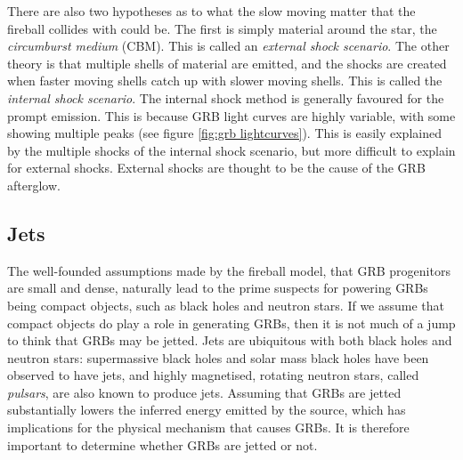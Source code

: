 \documentclass[11pt]{cuthesis}
\begin{document}
There are also two hypotheses as to what the slow moving matter that the fireball collides with could be. The first is simply material around the star, the \textit{circumburst medium} (CBM). This is called an \textit{external shock scenario}. The other theory is that multiple shells of material are emitted, and the shocks are created when faster moving shells catch up with slower moving shells. This is called the \textit{internal shock scenario}. The internal shock method is generally favoured for the prompt emission. This is because GRB light curves are highly variable, with some showing multiple peaks (see figure \ref{fig:grb lightcurves}). This is easily explained by the multiple shocks of the internal shock scenario, but more difficult to explain for external shocks. External shocks are thought to be the cause of the GRB afterglow.



\subsection{Jets} \label{sec:jets}
The well-founded assumptions made by the fireball model, that GRB progenitors are small and dense, naturally lead to the prime suspects for powering GRBs being compact objects, such as black holes and neutron stars. If we assume that compact objects do play a role in generating GRBs, then it is not much of a jump to think that GRBs may be jetted. Jets are ubiquitous with both black holes and neutron stars: supermassive black holes and solar mass black holes have been observed to have jets, and highly magnetised, rotating neutron stars, called \textit{pulsars}, are also known to produce jets. Assuming that GRBs are jetted substantially lowers the inferred energy emitted by the source, which has implications for the physical mechanism that causes GRBs. It is therefore important to determine whether GRBs are jetted or not. 
\end{document}
